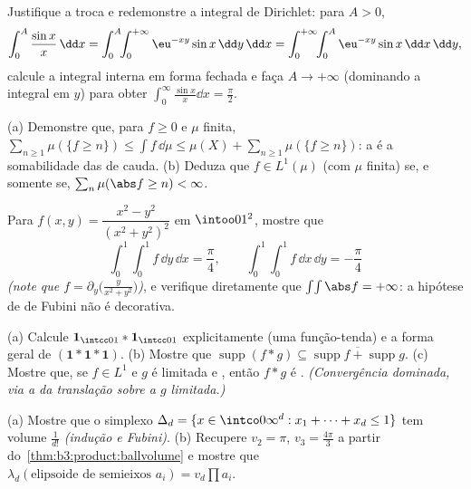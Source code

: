 \begin{exercise}[$\star$]\label{exo:b3:product:2}
Justifique a troca e redemonstre a integral de Dirichlet: para
$A > 0$,
\[
\int_0^A\frac{\sin x}x\,\dd x
= \int_0^A\!\!\int_0^{+\infty}\eu^{-xy}\sin x\,\dd y\,\dd x
= \int_0^{+\infty}\!\!\int_0^A \eu^{-xy}\sin x\,\dd x\,\dd y,
\]
calcule a integral interna em forma fechada e faça $A \to
+\infty$ (dominando a
integral em $y$) para obter $\int_0^\infty\frac{\sin x}x\dd x = \frac\pi2$.
\end{exercise}

\begin{exercise}[$\star\star$]\label{exo:b3:product:3}
(a) Demonstre que, para $f \geq 0$  e $\mu$ finita, $\sum_{n\geq1}\mu(\{f \geq n\}) \leq \int f\,\dd\mu \leq
\mu(X) + \sum_{n\geq1}\mu(\{f\geq n\})$: a
 é a somabilidade das  de cauda.
(b) Deduza que $f \in L^1(\mu)$ (com $\mu$ finita) se, e somente se, $\sum_n\mu(\abs f \geq n) < \infty$.
\end{exercise}

\begin{exercise}[$\star\star$]\label{exo:b3:product:4}
Para $f(x, y) = \dfrac{x^2 - y^2}{(x^2 + y^2)^2}$ em $\intoo01^2$, mostre que
\[
\int_0^1\!\!\int_0^1 f\,\dd y\,\dd x = \frac\pi4,
\qquad
\int_0^1\!\!\int_0^1 f\,\dd x\,\dd y = -\frac\pi4
\]
\emph{(note que $f = \partial_y\bigl(\frac{y}{x^2+y^2}\bigr)$)}, e verifique diretamente que $\int\!\int\abs f = +\infty$: a hipótese
de  de Fubini não é decorativa.
\end{exercise}

\begin{exercise}[$\star\star$]\label{exo:b3:product:5}
(a) Calcule $\mathbf 1_{\intcc01} * \mathbf 1_{\intcc01}$ explicitamente (uma função-tenda) e a forma geral de
$(\mathbf 1 * \mathbf 1 *
\mathbf 1)$.
(b) Mostre que $\operatorname{supp}(f * g) \subseteq
\overline{\operatorname{supp}f + \operatorname{supp}g}$.
(c) Mostre que, se $f \in L^1$ e $g$ é limitada e , então
$f * g$ é . \emph{(Convergência dominada, via a 
da translação sobre a $g$ limitada.)}
\end{exercise}

\begin{exercise}[$\star\star$]\label{exo:b3:product:6}
(a) Mostre que o simplexo $\Delta_d = \{x \in \intco0\infty^d
: x_1 + \dots + x_d \leq 1\}$ tem volume $\frac1{d!}$ \emph{(indução e
Fubini)}.
(b) Recupere $v_2 = \pi$, $v_3 = \frac{4\pi}3$ a partir do~\cref{thm:b3:product:ballvolume} e mostre que $\lambda_d(\text{elipsoide de semieixos } a_i) =
v_d\prod a_i$.
\end{exercise}

